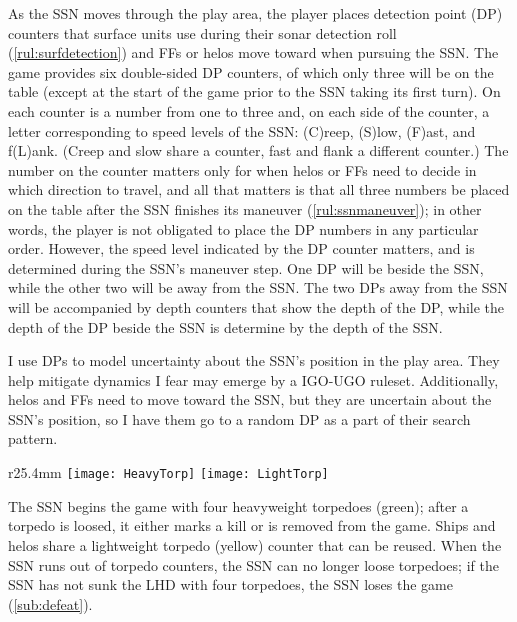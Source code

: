 \documentclass[../TacSubMicroRules.tex]{subfiles}
\begin{document}
 As the SSN moves through the play area, the player places detection point (DP) counters that surface units use during their sonar detection roll (\ref{rul:surfdetection}) and FFs or helos move toward when pursuing the SSN.
The game provides six double-sided DP counters, of which only three will be on the table (except at the start of the game prior to the SSN taking its first turn).
On each counter is a number from one to three and, on each side of the counter, a letter corresponding to speed levels of the SSN: (C)reep, (S)low, (F)ast, and f(L)ank.
(Creep and slow share a counter, fast and flank a different counter.)
The number on the counter matters only for when helos or FFs need to decide in which direction to travel, and all that matters is that all three numbers be placed on the table after the SSN finishes its maneuver (\ref{rul:ssnmaneuver}); in other words, the player is not obligated to place the DP numbers in any particular order.
However, the speed level indicated by the DP counter matters, and is determined during the SSN's maneuver step.
One DP will be beside the SSN, while the other two will be away from the SSN.
The two DPs away from the SSN will be accompanied by depth counters that show the depth of the DP, while the depth of the DP beside the SSN is determine by the depth of the SSN.

\begin{design}
    I use DPs to model uncertainty about the SSN's position in the play area.
    They help mitigate dynamics I fear may emerge by a IGO-UGO ruleset.
    Additionally, helos and FFs need to move toward the SSN, but they are uncertain about the SSN's position, so I have them go to a random DP as a part of their search pattern.
\end{design}

 
\begin{wrapfigure}{r}{25.4mm}
    \centering
    \texttt{[image: HeavyTorp]}
    \texttt{[image: LightTorp]}
\end{wrapfigure}
The SSN begins the game with four heavyweight torpedoes (green); after a torpedo is loosed, it either marks a kill or is removed from the game.
Ships and helos share a lightweight torpedo (yellow) counter that can be reused.
When the SSN runs out of torpedo counters, the SSN can no longer loose torpedoes; if the SSN has not sunk the LHD with four torpedoes, the SSN loses the game (\ref{sub:defeat}).
\end{document}
